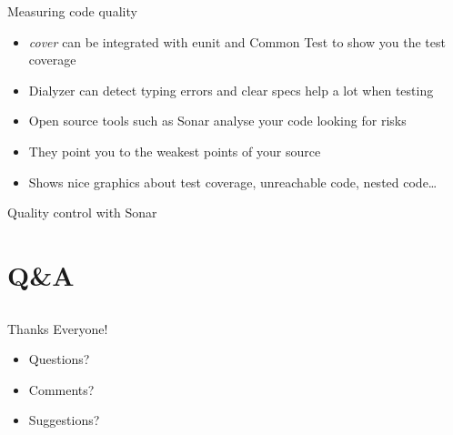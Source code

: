 \documentclass[]{beamer}
\begin{document}
\begin{frame}{Measuring code quality}
    \begin{itemize}
    \item \emph{cover} can be integrated with eunit and Common Test to show you the test coverage
    \pause
    \item Dialyzer can detect typing errors and clear specs help a lot when testing
    \pause
    \item Open source tools such as Sonar analyse your code looking for risks
    \pause
    \item They point you to the weakest points of your source
    \pause
    \item Shows nice graphics about test coverage, unreachable code, nested code\dots
    \end{itemize}
\end{frame}

\begin{frame}{Quality control with Sonar}
\end{frame}

\section{Q\&A}
\subsection{}

\begin{frame}{Thanks Everyone!}
    \begin{itemize}
    \item Questions?
    \item Comments?
    \item Suggestions?
    \end{itemize}
\end{frame}
%
%
%
%
%
%
\end{document}

